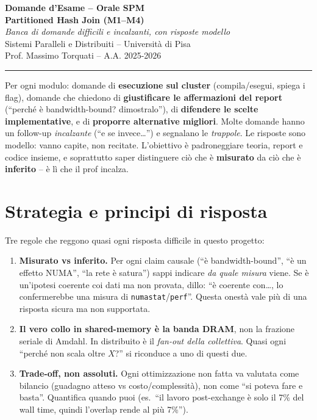 \documentclass[11pt,a4paper]{article}
\begin{document}
\begin{titlepage}
\centering
\vspace*{1.5cm}
{\LARGE\bfseries Domande d'Esame -- Orale SPM\\[0.4em]
Partitioned Hash Join (M1--M4)\\[1em]}
{\large\itshape Banca di domande difficili e incalzanti, con risposte modello}\\[1.5em]
{\large Sistemi Paralleli e Distribuiti -- Università di Pisa}\\[0.4em]
{\large Prof. Massimo Torquati -- A.A. 2025-2026}\\[2em]
\hrule\vspace{1em}
\begin{flushleft}\small
Per ogni modulo: domande di \textbf{esecuzione sul cluster} (compila/esegui, spiega i flag), domande che
chiedono di \textbf{giustificare le affermazioni del report} (``perché è bandwidth-bound? dimostralo''),
di \textbf{difendere le scelte implementative}, e di \textbf{proporre alternative migliori}. Molte domande
hanno un follow-up \emph{incalzante} (``e se invece\dots'') e segnalano le \emph{trappole}. Le risposte sono
modello: vanno capite, non recitate. L'obiettivo è padroneggiare teoria, report e codice insieme, e
soprattutto saper distinguere ciò che è \textbf{misurato} da ciò che è \textbf{inferito} -- è lì che il prof
incalza.
\end{flushleft}
\end{titlepage}

\tableofcontents
\newpage

\section{Strategia e principi di risposta}

Tre regole che reggono quasi ogni risposta difficile in questo progetto:

\begin{enumerate}
  \item \textbf{Misurato vs inferito.} Per ogni claim causale (``è bandwidth-bound'', ``è un effetto NUMA'', ``la rete è satura'') sappi indicare \emph{da quale misura} viene. Se è un'ipotesi coerente coi dati ma non provata, dillo: ``è coerente con\dots, lo confermerebbe una misura di \texttt{numastat}/\texttt{perf}''. Questa onestà vale più di una risposta sicura ma non supportata.
  \item \textbf{Il vero collo in shared-memory è la banda DRAM}, non la frazione seriale di Amdahl. In distribuito è il \emph{fan-out della collettiva}. Quasi ogni ``perché non scala oltre $X$?'' si riconduce a uno di questi due.
  \item \textbf{Trade-off, non assoluti.} Ogni ottimizzazione non fatta va valutata come bilancio (guadagno atteso vs costo/complessità), non come ``si poteva fare e basta''. Quantifica quando puoi (es.\ ``il lavoro post-exchange è solo il 7\% del wall time, quindi l'overlap rende al più 7\%'').
\end{enumerate}
\end{document}

